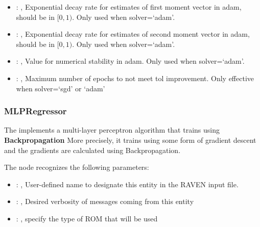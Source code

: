 \begin{itemize}
    \item {}: ,
      Exponential decay rate for estimates of first moment vector in adam, should be in $[0, 1)$.
      Only used when solver=`adam'.

    \item {}: ,
      Exponential decay rate for estimates of second moment vector in adam, should be in $[0, 1)$.
      Only used when solver=`adam'.

    \item {}: ,
      Value for numerical stability in adam. Only used when solver=`adam'.

    \item {}: ,
      Maximum number of epochs to not meet tol improvement. Only effective when
      solver=`sgd' or `adam'
  \end{itemize}


\subsubsection{MLPRegressor}
  The  implements a multi-layer perceptron algorithm that trains using
  \textbf{Backpropagation}                             More precisely, it trains using some form of
  gradient descent and the gradients are calculated using Backpropagation.

  The  node recognizes the following parameters:
    \begin{itemize}
      \item {}: ,
        User-defined name to designate this entity in the RAVEN input file.
      \item {}: ,
        Desired verbosity of messages coming from this entity
      \item {}: ,
        specify the type of ROM that will be used
  \end{itemize}

